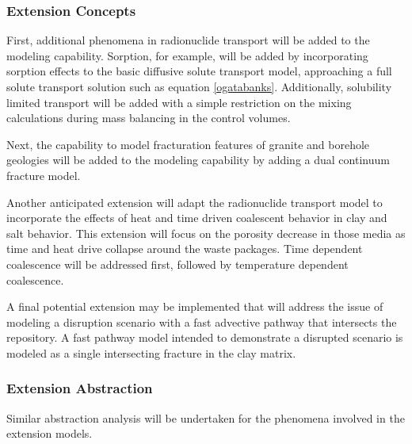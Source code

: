 \subsubsection{Extension Concepts}


    
    First, additional phenomena in radionuclide transport will be added to the 
    modeling capability. Sorption, for example, will be added by incorporating 
    sorption effects to the basic diffusive solute transport model, approaching  
    a full solute transport solution such as equation \eqref{ogatabanks}. 
    Additionally, solubility limited transport will be added with a simple 
    restriction on the mixing calculations during mass balancing in the control 
    volumes.

    
    Next, the capability to model fracturation features of granite and borehole 
    geologies will be added  to the modeling capability by adding a dual 
    continuum fracture model.  


    Another anticipated extension will adapt the radionuclide transport model 
    to incorporate the effects of heat and time driven coalescent behavior in 
    clay and salt behavior. This extension will focus on the porosity decrease 
    in those media as time and heat drive collapse around the waste packages.  
    Time dependent coalescence will be addressed first, followed by temperature  
    dependent coalescence.


    A final potential extension may be implemented that will address the issue of 
    modeling a disruption scenario with a fast advective pathway that intersects 
    the repository.  A fast pathway model intended to demonstrate a disrupted 
    scenario is modeled as a single intersecting fracture in the clay matrix. 

\subsubsection{Extension Abstraction}


  Similar abstraction analysis will be undertaken for the phenomena involved in 
  the extension models. 
  

